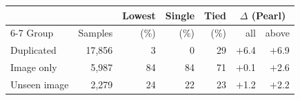 \begin{tabular}{@{}lrrrrrr@{}}
\toprule
& & Lowest & Single & Tied & \multicolumn{2}{c}{$\Delta$ (Pearl)} \\
\cmidrule(l){6-7}
Group & Samples & (\%) & (\%) & (\%) & all & above \\
\midrule
Duplicated & 17,856 & 3 & 0 & 29 & $+$6.4 & $+$6.9 \\
Image only & 5,987 & 84 & 84 & 71 & $+$0.1 & $+$2.6 \\
Unseen image & 2,279 & 24 & 22 & 23 & $+$1.2 & $+$2.2 \\
\bottomrule
\end{tabular}

